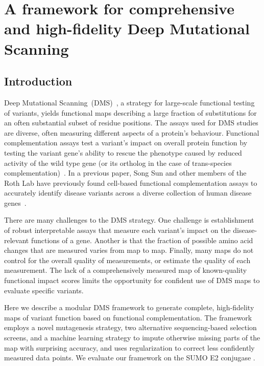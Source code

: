 

\chapter[A comprehensive high-fidelity DMS framework]{A framework for comprehensive and high-fidelity Deep Mutational Scanning}
\label{ch:data1}

\section{Introduction}


Deep Mutational Scanning~(DMS)~\cite{fowler_high-resolution_2010}, a strategy for large-scale functional testing of variants, yields functional maps describing a large fraction of substitutions for an often substantial subset of residue positions. The assays used for DMS studies are diverse, often measuring different aspects of a protein's behaviour. Functional complementation assays test a variant's impact on overall protein function by testing the variant gene's ability to rescue the phenotype caused by reduced activity of the wild type gene (or its ortholog in the case of trans-species complementation)~\cite{lee_complementation_1987,osborn_rescuing_2007}. In a previous paper, Song Sun and other members of the Roth Lab have previously found cell-based functional complementation assays to accurately identify disease variants across a diverse collection of human disease genes~\cite{sun_extended_2016}. 

There are many challenges to the DMS strategy.  One challenge is establishment of robust interpretable assays that measure each variant's impact on the disease-relevant functions of a gene. Another is that the fraction of possible amino acid changes that are measured varies from map to map. Finally, many maps do not control for the overall quality of measurements, or estimate the quality of each measurement. The lack of a comprehensively measured map of known-quality functional impact scores limits the opportunity for confident use of DMS maps to evaluate specific variants.

Here we describe a modular DMS framework to generate  complete, high-fidelity maps of variant function based on functional complementation. The framework employs a novel mutagenesis strategy, two alternative sequencing-based selection screens, and a machine learning strategy to impute  otherwise missing parts of the map with surprising accuracy, and uses regularization to correct less confidently measured data points. We evaluate our framework on the SUMO E2 conjugase .


